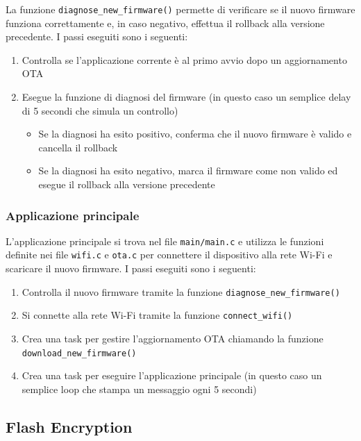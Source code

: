 \documentclass[a4paper]{article}
\begin{document}
\noindent
La funzione \texttt{diagnose\_new\_firmware()} permette di verificare se il nuovo
firmware funziona correttamente e, in caso negativo, effettua il rollback alla versione
precedente. I passi eseguiti sono i seguenti:
\begin{enumerate}
  \item Controlla se l'applicazione corrente è al primo avvio dopo un aggiornamento OTA
  \item Esegue la funzione di diagnosi del firmware (in questo caso un semplice delay di
    5 secondi che simula un controllo)
    \begin{itemize}
      \item Se la diagnosi ha esito positivo, conferma che il nuovo firmware è valido
        e cancella il rollback
      \item Se la diagnosi ha esito negativo, marca il firmware come non valido
        ed esegue il rollback alla versione precedente
    \end{itemize}
\end{enumerate}

\subsubsection{Applicazione principale}
L'applicazione principale si trova nel file \texttt{main/main.c} e utilizza le funzioni
definite nei file \texttt{wifi.c} e \texttt{ota.c} per connettere il dispositivo
alla rete Wi-Fi e scaricare il nuovo firmware. I passi eseguiti sono i seguenti:
\begin{enumerate}
  \item Controlla il nuovo firmware tramite la funzione \texttt{diagnose\_new\_firmware()}
  \item Si connette alla rete Wi-Fi tramite la funzione \texttt{connect\_wifi()}
  \item Crea una task per gestire l'aggiornamento OTA chiamando la funzione
    \texttt{download\_new\_firmware()}
  \item Crea una task per eseguire l'applicazione principale (in questo caso un semplice
    loop che stampa un messaggio ogni 5 secondi)
\end{enumerate}

\subsection{Flash Encryption}
\end{document}

